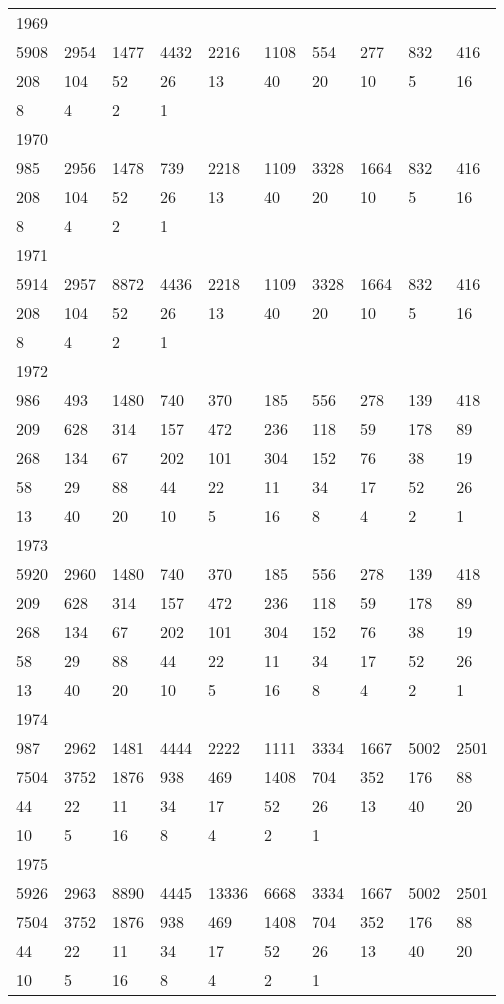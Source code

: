\begin{longtable}{*{10}{l}}
1969&&&&&&&&&\\
5908& 2954& 1477& 4432& 2216& 1108& 554& 277& 832& 416\\
208& 104& 52& 26& 13& 40& 20& 10& 5& 16\\
8& 4& 2& 1& \\

1970&&&&&&&&&\\
985& 2956& 1478& 739& 2218& 1109& 3328& 1664& 832& 416\\
208& 104& 52& 26& 13& 40& 20& 10& 5& 16\\
8& 4& 2& 1& \\

1971&&&&&&&&&\\
5914& 2957& 8872& 4436& 2218& 1109& 3328& 1664& 832& 416\\
208& 104& 52& 26& 13& 40& 20& 10& 5& 16\\
8& 4& 2& 1& \\

1972&&&&&&&&&\\
986& 493& 1480& 740& 370& 185& 556& 278& 139& 418\\
209& 628& 314& 157& 472& 236& 118& 59& 178& 89\\
268& 134& 67& 202& 101& 304& 152& 76& 38& 19\\
58& 29& 88& 44& 22& 11& 34& 17& 52& 26\\
13& 40& 20& 10& 5& 16& 8& 4& 2& 1\\

1973&&&&&&&&&\\
5920& 2960& 1480& 740& 370& 185& 556& 278& 139& 418\\
209& 628& 314& 157& 472& 236& 118& 59& 178& 89\\
268& 134& 67& 202& 101& 304& 152& 76& 38& 19\\
58& 29& 88& 44& 22& 11& 34& 17& 52& 26\\
13& 40& 20& 10& 5& 16& 8& 4& 2& 1\\

1974&&&&&&&&&\\
987& 2962& 1481& 4444& 2222& 1111& 3334& 1667& 5002& 2501\\
7504& 3752& 1876& 938& 469& 1408& 704& 352& 176& 88\\
44& 22& 11& 34& 17& 52& 26& 13& 40& 20\\
10& 5& 16& 8& 4& 2& 1& \\

1975&&&&&&&&&\\
5926& 2963& 8890& 4445& 13336& 6668& 3334& 1667& 5002& 2501\\
7504& 3752& 1876& 938& 469& 1408& 704& 352& 176& 88\\
44& 22& 11& 34& 17& 52& 26& 13& 40& 20\\
10& 5& 16& 8& 4& 2& 1& \\


\end{longtable}
